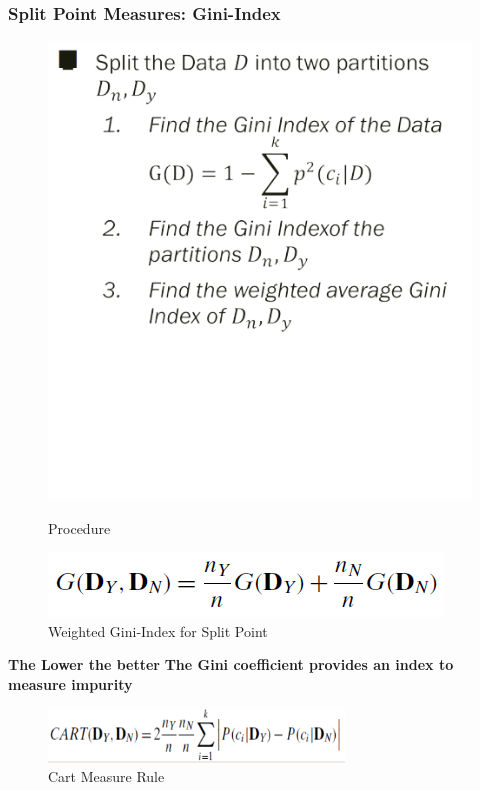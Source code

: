 \begin{itemize}
\subsubsection{Split Point Measures: Gini-Index}
\begin{figure}[H]
    \centering
    \begin{minipage}{0.5\textwidth}
        \centering
        \includegraphics[width=\textwidth]{Figures/dt5.png} %
        \caption{Procedure}
    \end{minipage}\hfill
    \begin{minipage}{0.5\textwidth}
        \centering
        \includegraphics[width=\textwidth]{Figures/dt6.png} %
        \caption{Weighted Gini-Index for Split Point}
    \end{minipage}
\end{figure}
\textbf{The Lower the better}
\textbf{The Gini coefficient provides an index to measure impurity}
\begin{figure}[H]
\centerline{\includegraphics[width=0.7\textwidth]{Figures/cart}}
\caption{\label{fig:figure}Cart Measure Rule}
\end{figure}


\end{itemize}
